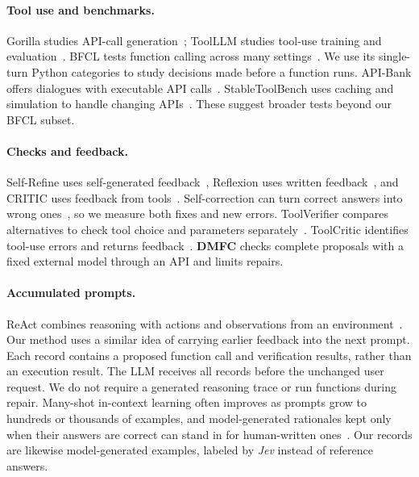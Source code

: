 \paragraph{Tool use and benchmarks.}
Gorilla studies API-call generation~\cite{patil2024gorilla}; ToolLLM studies tool-use training and evaluation~\cite{qin2024toolllm}. BFCL tests function calling across many settings~\cite{patil2025bfcl}. We use its single-turn Python categories to study decisions made before a function runs. API-Bank offers dialogues with executable API calls~\cite{li2023apibank}. StableToolBench uses caching and simulation to handle changing APIs~\cite{guo2024stabletoolbench}. These suggest broader tests beyond our BFCL subset.

\paragraph{Checks and feedback.}
Self-Refine uses self-generated feedback~\cite{madaan2023selfrefine}, Reflexion uses written feedback~\cite{shinn2023reflexion}, and CRITIC uses feedback from tools~\cite{gou2024critic}. Self-correction can turn correct answers into wrong ones~\cite{huang2024selfcorrect}, so we measure both fixes and new errors. ToolVerifier compares alternatives to check tool choice and parameters separately~\cite{mekala2024toolverifier}. ToolCritic identifies tool-use errors and returns feedback~\cite{hamad2025toolcritic}. \textbf{DMFC} checks complete proposals with a fixed external model through an API and limits repairs.

\paragraph{Accumulated prompts.}
ReAct combines reasoning with actions and observations from an environment~\cite{yao2023react}. Our method uses a similar idea of carrying earlier feedback into the next prompt. Each record contains a proposed function call and verification results, rather than an execution result. The LLM receives all records before the unchanged user request. We do not require a generated reasoning trace or run functions during repair. Many-shot in-context learning often improves as prompts grow to hundreds or thousands of examples, and model-generated rationales kept only when their answers are correct can stand in for human-written ones~\cite{agarwal2024manyshot}. Our records are likewise model-generated examples, labeled by \textit{Jev} instead of reference answers.

